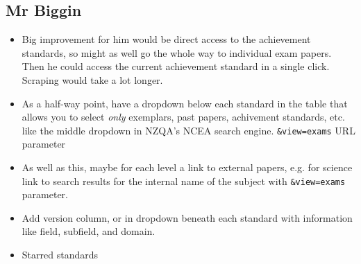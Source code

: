 \documentclass{article}
\begin{document}
\subsection*{Mr Biggin}
\begin{itemize}
    \item Big improvement for him would be direct access to the achievement standards, so might as well go the whole way to individual exam papers. Then he could access the current achievement standard in a single click. Scraping would take a lot longer.
    \item As a half-way point, have a dropdown below each standard in the table that allows you to select \textit{only} exemplars, past papers, achivement standards, etc. like the middle dropdown in NZQA's NCEA search engine. \texttt{\&view=exams} URL parameter
    \item As well as this, maybe for each level a link to external papers, e.g. for science link to search results for the internal name of the subject with \texttt{\&view=exams} parameter.
    \item Add version column, or in dropdown beneath each standard with information like field, subfield, and domain.
    \item Starred standards
\end{itemize}
\end{document}
